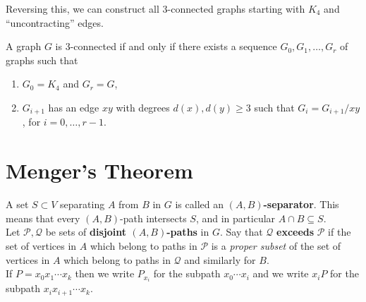 Reversing this, we can construct all 3-connected graphs starting with \(K_4\) and ``uncontracting'' edges.

\begin{theorem}
    A graph \(G\) is 3-connected if and only if there exists a sequence \(G_0, G_1, \dots, G_r\) of graphs such that
    \begin{enumerate}[label=(\roman*)]
        \item \(G_0 = K_4\) and \(G_r = G\),
        \item \(G_{i + 1}\) has an edge \(xy\) with degrees \(d(x), d(y) \geq 3\) such that \(G_i = G_{i + 1}/xy\), for \(i = 0, \dots, r - 1\).
    \end{enumerate}
\end{theorem}

\section{Menger's Theorem}
A set \(S \subset V\) separating \(A\) from \(B\) in \(G\) is called an \textbf{\((A, B)\)-separator}. This means that every \((A, B)\)-path intersects \(S\), and in particular \(A \cap B \subseteq S\). \\

Let \(\mathcal{P}, \mathcal{Q}\) be sets of \textbf{disjoint \((A, B)\)-paths} in \(G\). Say that \(\mathcal{Q}\) \textbf{exceeds} \(\mathcal{P}\) if the set of vertices in \(A\) which belong to paths in \(\mathcal{P}\) is a \textit{proper subset} of the set of vertices in \(A\) which belong to paths in \(\mathcal{Q}\) and similarly for \(B\). \\

If \(P = x_0 x_1 \cdots x_k\) then we write \(P_{x_i}\) for the subpath \(x_0 \cdots x_i\) and we write \(x_i P\) for the subpath \(x_i x_{i + 1} \cdots x_k\).

